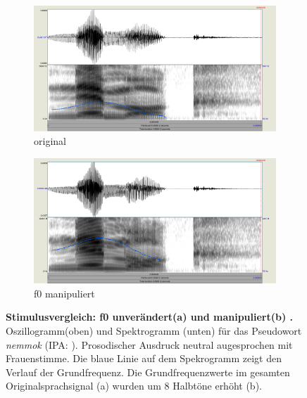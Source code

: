 \documentclass[11pt,a4paper,headsepline,twoside,toc=bibliography]{scrreprt}
\begin{document}
\begin{figure}
	\centering
	\begin{subfigure}{1\textwidth}
		\centering
		\includegraphics[width=1\linewidth]{pics/nemmok.png}
		\caption{original}
		\label{fig:nemmok_original}
	\end{subfigure}
	\par\bigskip
	\begin{subfigure}{1\textwidth}
		\centering
		\includegraphics[width=1\linewidth]{pics/nemmok_pitch.png}
		\caption{f0 manipuliert}
		\label{fig:nemmok_pitch}
	\end{subfigure}
	\caption{\textbf{Stimulusvergleich: f0 unverändert(a) und manipuliert(b) .} Oszillogramm(oben) und Spektrogramm (unten) für das Pseudowort \emph{nemmok} (IPA: ). Prosodischer Ausdruck neutral augesprochen mit Frauenstimme. Die blaue Linie auf dem Spekrogramm zeigt den Verlauf der Grundfrequenz. Die Grundfrequenzwerte im gesamten Originalsprachsignal (a) wurden um 8 Halbtöne erhöht (b). }
	\label{fig:f0_manipulation}
	
	
\end{figure}
	
\end{document}
